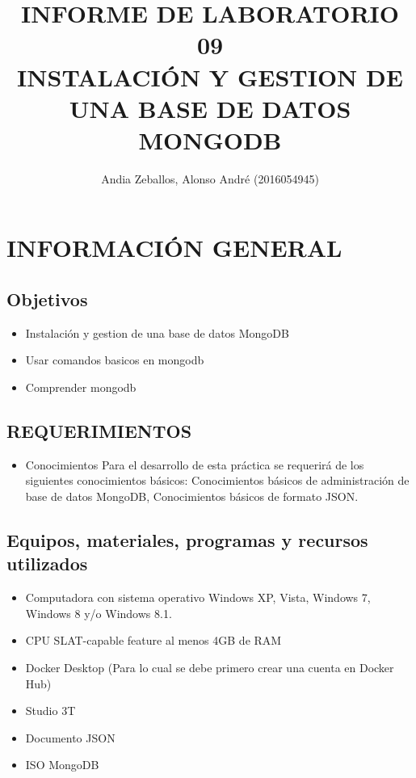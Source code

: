 \documentclass[preprint,12pt]{elsarticle}
\begin{document}
	
	\begin{frontmatter} 

		\title{\huge INFORME DE LABORATORIO 09 \\
				INSTALACIÓN Y GESTION DE UNA BASE DE DATOS MONGODB}
		
		\author{Andia Zeballos, Alonso André    	(2016054945)} 
		\address{Escuela Profesional de Ingeniería de Sistemas}
		\address{Universidad Privada de Tacna}
		\address{Tacna, Perú}
		

	\end{frontmatter}


\section{INFORMACIÓN GENERAL} 

\subsection {\textbf{Objetivos}}
\begin{itemize}
	\item Instalación y gestion de una base de datos MongoDB
	\item Usar comandos basicos en mongodb
	\item Comprender mongodb
\end{itemize}



\subsection {\textbf{REQUERIMIENTOS}}
\begin{itemize}
	\item Conocimientos
Para el desarrollo de esta práctica se requerirá de los siguientes conocimientos básicos: Conocimientos básicos de administración de base de datos MongoDB, Conocimientos básicos de formato JSON.
\end{itemize}


\subsection {\textbf{Equipos, materiales, programas y recursos utilizados}}
\begin{itemize}
	\item Computadora con sistema operativo Windows XP, Vista, Windows 7, Windows 8 y/o Windows 8.1.
	\item CPU SLAT-capable feature al menos 4GB de RAM
	\item Docker Desktop (Para lo cual se debe primero crear una cuenta en Docker Hub)
	\item Studio 3T
	\item Documento JSON
	\item ISO MongoDB
\end{itemize}
\end{document}
